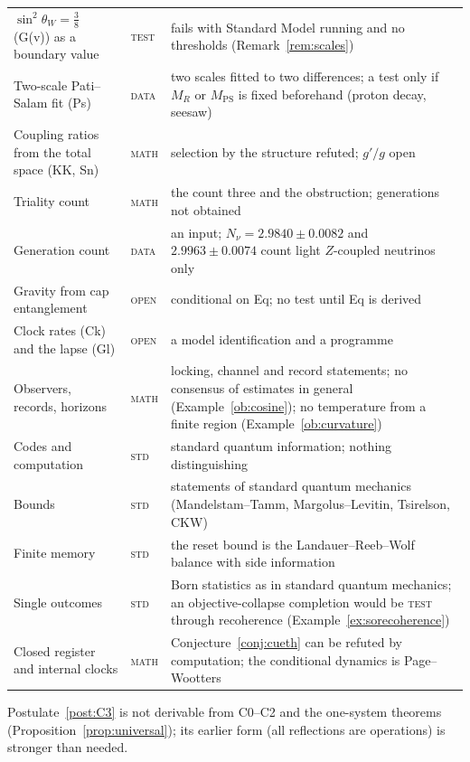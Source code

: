 \documentclass[aps,pra,onecolumn,superscriptaddress,nofootinbib,10pt]{revtex4-2}
\theoremstyle{definition}
\theoremstyle{remark}
\begin{document}
\begin{table}[h]
\begin{tabular}{@{}p{}p{}p{}@{}}
{$\sin^2\theta_W=\tfrac38$ (G(v)) as a boundary value} & \textsc{test} & fails with Standard Model running and no thresholds (Remark~\ref{rem:scales})\\
{Two-scale Pati--Salam fit (Ps)} & \textsc{data} & two scales fitted to two differences; a test only if $M_R$ or $M_{\mathrm{PS}}$ is fixed beforehand (proton decay, seesaw)\\
{Coupling ratios from the total space (KK, Sn)} & \textsc{math} & selection by the structure refuted; $g'/g$ open\\
{Triality count} & \textsc{math} & the count three and the obstruction; generations not obtained\\
{Generation count} & \textsc{data} & an input; $N_\nu=2.9840\pm0.0082$ and $2.9963\pm0.0074$ count light $Z$-coupled neutrinos only\\
{Gravity from cap entanglement} & \textsc{open} & conditional on Eq; no test until Eq is derived\\
{Clock rates (Ck) and the lapse (Gl)} & \textsc{open} & a model identification and a programme\\
{Observers, records, horizons} & \textsc{math} & locking, channel and record statements; no consensus of estimates in general (Example~\ref{ob:cosine}); no temperature from a finite region (Example~\ref{ob:curvature})\\
{Codes and computation} & \textsc{std} & standard quantum information; nothing distinguishing\\
{Bounds} & \textsc{std} & statements of standard quantum mechanics (Mandelstam--Tamm, Margolus--Levitin, Tsirelson, CKW)\\
{Finite memory} & \textsc{std} & the reset bound is the Landauer--Reeb--Wolf balance with side information\\
{Single outcomes} & \textsc{std} & Born statistics as in standard quantum mechanics; an objective-collapse completion would be \textsc{test} through recoherence (Example~\ref{ex:sorecoherence})\\
{Closed register and internal clocks} & \textsc{math} & Conjecture~\ref{conj:cueth} can be refuted by computation; the conditional dynamics is Page--Wootters\\
\bottomrule
\end{tabular}
\end{table}




Postulate~\ref{post:C3} is not derivable from C0--C2 and the
one-system theorems (Proposition~\ref{prop:universal}); its earlier form (all reflections are
operations) is stronger than needed.
\end{document}
